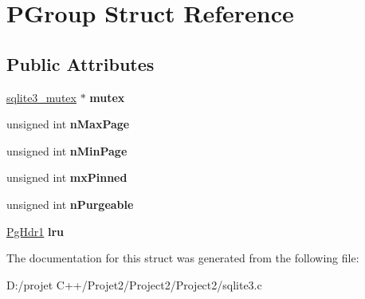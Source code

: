 \hypertarget{struct_p_group}{}\section{P\+Group Struct Reference}
\label{struct_p_group}
\subsection*{Public Attributes}
\begin{DoxyCompactItemize}
\item 
\mbox{\label{struct_p_group_a7173aa723aa61d6b1f79cde2f7d0f74d}} 
\mbox{\hyperlink{structsqlite3__mutex}{sqlite3\+\_\+mutex}} $\ast$ {\bfseries mutex}
\item 
\mbox{\label{struct_p_group_a219ff89d38529cbb6b47e60f41896f41}} 
unsigned int {\bfseries n\+Max\+Page}
\item 
\mbox{\label{struct_p_group_aedf84324cb7138c9f9ee31814e8274c0}} 
unsigned int {\bfseries n\+Min\+Page}
\item 
\mbox{\label{struct_p_group_ac7cdffac1c20d260e8230dba4ab05cea}} 
unsigned int {\bfseries mx\+Pinned}
\item 
\mbox{\label{struct_p_group_a180305522a33fda4ce76dd133c29fd6a}} 
unsigned int {\bfseries n\+Purgeable}
\item 
\mbox{\label{struct_p_group_a73c1201996cb4750677fdf1d73f50a92}} 
\mbox{\hyperlink{struct_pg_hdr1}{Pg\+Hdr1}} {\bfseries lru}
\end{DoxyCompactItemize}


The documentation for this struct was generated from the following file\+:\begin{DoxyCompactItemize}
\item 
D\+:/projet C++/\+Projet2/\+Project2/\+Project2/sqlite3.\+c\end{DoxyCompactItemize}
